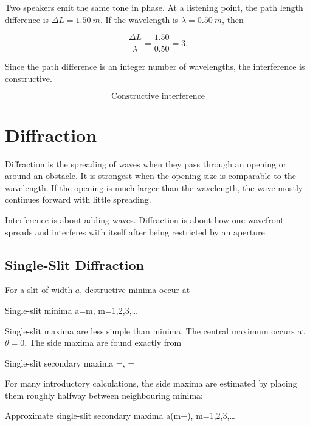 \documentclass{studentnotes}
\begin{document}
Two speakers emit the same tone in phase. At a listening point, the path length
difference is \(\Delta L=\SI{1.50}{m}\). If the wavelength is
\(\lambda=\SI{0.50}{m}\), then

\[
    \frac{\Delta L}{\lambda}=\frac{1.50}{0.50}=3.
\]

Since the path difference is an integer number of wavelengths, the interference
is constructive.

\[
    \boxed{\text{Constructive interference}}
\]

\section{Diffraction}

Diffraction is the spreading of waves when they pass through an opening or
around an obstacle. It is strongest when the opening size is comparable to the
wavelength. If the opening is much larger than the wavelength, the wave mostly
continues forward with little spreading.

\begin{quicknote}
    Interference is about adding waves. Diffraction is about how one wavefront
    spreads and interferes with itself after being restricted by an aperture.
\end{quicknote}

\subsection{Single-Slit Diffraction}

For a slit of width \(a\), destructive minima occur at

\begin{namedformula}{Single-slit minima}
    a\sin\theta=m\lambda,
    \qquad
    m=1,2,3,\ldots
\end{namedformula}

Single-slit maxima are less simple than minima. The central maximum occurs at
\(\theta=0\). The side maxima are found exactly from

\begin{namedformula}{Single-slit secondary maxima}
    \tan\beta=\beta,
    \qquad
    \beta=
\end{namedformula}

For many introductory calculations, the side maxima are estimated by placing
them roughly halfway between neighbouring minima:

\begin{namedformula}{Approximate single-slit secondary maxima}
    a\sin\theta\approx\left(m+\right)\lambda,
    \qquad
    m=1,2,3,\ldots
\end{namedformula}
\end{document}
